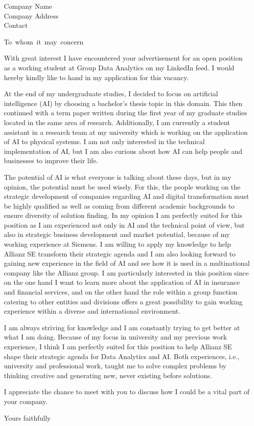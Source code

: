 \documentclass[
parskip=half,
fontsize=11pt, %
twoside=off, %
version=last,
foldmarks=false,
frommobilephone,
fromemail,
subject=titled,
backaddress=false,
]    
{scrlttr2}
\newcommand{\address}{
Company Name    \\
Company Address \\
Contact         \\
}
\begin{document}
\begin{letter}{\address}
  \opening{To~whom~it~may~concern}

  With great interest I have encountered your advertisement for an open position as a working student at Group Data Analytics on my LinkedIn feed.
  I would hereby kindly like to hand in my application for this vacancy.

  At the end of my undergraduate studies, I decided to focus on artificial intelligence (AI) by choosing a bachelor’s thesis topic in this domain.
  This then continued with a term paper written during the first year of my graduate studies located in the same area of research.
  Additionally, I am currently a student assistant in a research team at my university which is working on the application of AI to physical systems.
  I am not only interested in the technical implementation of AI, but I am also curious about how AI can help people and businesses to improve their life.

  The potential of AI is what everyone is talking about these days, but in my opinion, the potential must be used wisely.
  For this, the people working on the strategic development of companies regarding AI and digital transformation must be highly qualified as well as coming from different academic backgrounds to ensure diversity of solution finding.
  In my opinion I am perfectly suited for this position as I am experienced not only in AI and the technical point of view, but also in strategic business development and market potential, because of my working experience at Siemens.
  I am willing to apply my knowledge to help Allianz SE transform their strategic agenda and I am also looking forward to gaining new experience in the field of AI and see how it is used in a multinational company like the Allianz group.
  I am particularly interested in this position since on the one hand I want to learn more about the application of AI in insurance and financial services, and on the other hand the role within a group function catering to other entities and divisions offers a great possibility to gain working experience within a diverse and international environment.

  I am always striving for knowledge and I am constantly trying to get better at what I am doing.
  Because of my focus in university and my previous work experience, I think I am perfectly suited for this position to help Allianz SE shape their strategic agenda for Data Analytics and AI.
  Both experiences, i.e., university and professional work, taught me to solve complex problems by thinking creative and generating new, never existing before solutions.

  I appreciate the chance to meet with you to discuss how I could be a vital part of your company.
  \closing{Yours faithfully}


\end{letter}
\end{document}
